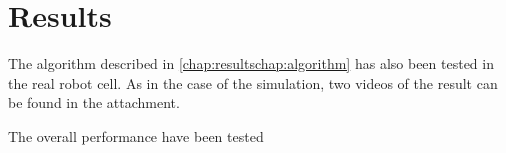 \chapter{Results}\label{chap:results}
The algorithm described in \autoref{chap:resultschap:algorithm} has also been tested in the real robot cell. As in the case of the simulation, two videos of the result can be found in the attachment. 

\begin{figure}[H]
    \caption{}
    \label{fig:result}    
\end{figure}
The overall performance have been tested